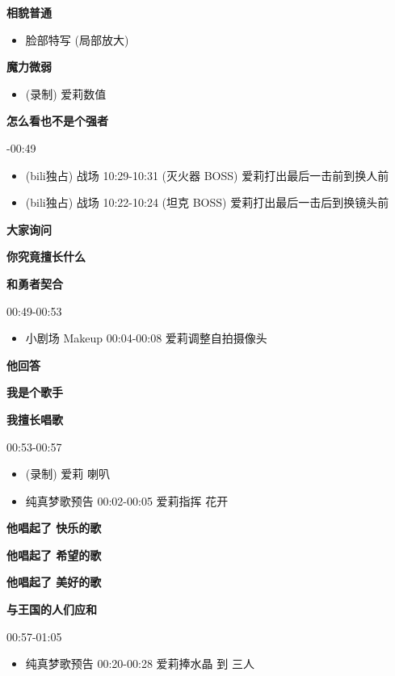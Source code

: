 \documentclass[a4paper]{article}
\begin{document}
\textbf{相貌普通}

\begin{itemize}
    \item 脸部特写 (局部放大)
\end{itemize}

\textbf{魔力微弱}

\begin{itemize}
    \item (录制) 爱莉数值
\end{itemize}

\textbf{怎么看也不是个强者}

-00:49

\begin{itemize}
    \item (bili独占) 战场 10:29-10:31 (灭火器 BOSS) 爱莉打出最后一击前到换人前
    \item (bili独占) 战场 10:22-10:24 (坦克 BOSS) 爱莉打出最后一击后到换镜头前
\end{itemize}

\textbf{大家询问}

\textbf{你究竟擅长什么}

\textbf{和勇者契合}

00:49-00:53

\begin{itemize}
    \item 小剧场 Makeup 00:04-00:08 爱莉调整自拍摄像头
\end{itemize}

\textbf{他回答}

\textbf{我是个歌手}

\textbf{我擅长唱歌}

00:53-00:57

\begin{itemize}
    \item (录制) 爱莉 喇叭
    \item 纯真梦歌预告 00:02-00:05 爱莉指挥 花开
\end{itemize}

\textbf{他唱起了 快乐的歌}

\textbf{他唱起了 希望的歌}

\textbf{他唱起了 美好的歌}

\textbf{与王国的人们应和}

00:57-01:05

\begin{itemize}
    \item 纯真梦歌预告 00:20-00:28 爱莉捧水晶 到 三人
\end{itemize}
\end{document}
